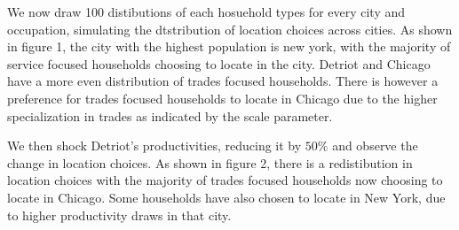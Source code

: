 \documentclass[10pt]{article}
\begin{document}
We now draw 100 distibutions of each hosuehold types for every city and occupation, simulating the dtstribution of location choices across cities. As shown in figure 1, the city with the highest population is new york, with the majority of service focused households choosing to locate in the city. Detriot and Chicago have a more even distribution of trades focused households. There is however a preference for trades focused households to locate in Chicago due to the higher specialization in trades as indicated by the scale parameter.

We then shock Detriot's productivities, reducing it by $50\%$ and observe the change in location choices. As shown in figure 2, there is a redistibution in location choices with the majority of trades focused households now choosing to locate in Chicago. Some households have also chosen to locate in New York, due to higher productivity draws in that city.




\end{document}
